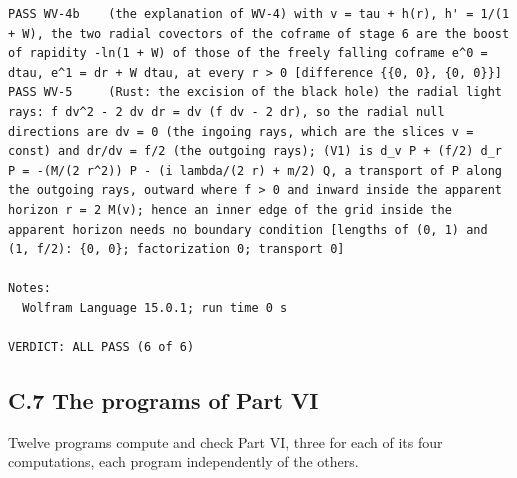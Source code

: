 \documentclass[
  10pt,
]{article}
\begin{document}
\begin{verbatim}
PASS WV-4b    (the explanation of WV-4) with v = tau + h(r), h' = 1/(1 + W), the two radial covectors of the coframe of stage 6 are the boost of rapidity -ln(1 + W) of those of the freely falling coframe e^0 = dtau, e^1 = dr + W dtau, at every r > 0 [difference {{0, 0}, {0, 0}}]
PASS WV-5     (Rust: the excision of the black hole) the radial light rays: f dv^2 - 2 dv dr = dv (f dv - 2 dr), so the radial null directions are dv = 0 (the ingoing rays, which are the slices v = const) and dr/dv = f/2 (the outgoing rays); (V1) is d_v P + (f/2) d_r P = -(M/(2 r^2)) P - (i lambda/(2 r) + m/2) Q, a transport of P along the outgoing rays, outward where f > 0 and inward inside the apparent horizon r = 2 M(v); hence an inner edge of the grid inside the apparent horizon needs no boundary condition [lengths of (0, 1) and (1, f/2): {0, 0}; factorization 0; transport 0]

Notes:
  Wolfram Language 15.0.1; run time 0 s

VERDICT: ALL PASS (6 of 6)
\end{verbatim}

\hypertarget{c.7-the-programs-of-part-vi}{%
\subsection{C.7 The programs of Part
VI}\label{c.7-the-programs-of-part-vi}}

Twelve programs compute and check Part VI, three for each of its four
computations, each program independently of the others.
\end{document}
